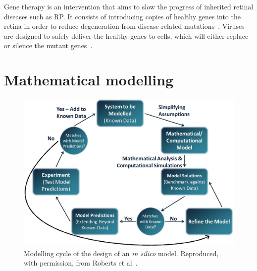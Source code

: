 \documentclass{article}
\begin{document}
Gene therapy is an intervention that aims to slow the progress of inherited retinal diseases such as RP.
It consists of introducing copies of healthy genes into the retina in order to reduce degeneration from disease-related mutations~\cite{Battu_2022}.
Viruses are designed to safely deliver the healthy genes to cells, which will either replace or silence the mutant genes~\cite{Battu_2022}.








\section{Mathematical modelling}\label{sec:MathematicalPrimer}


\begin{figure}[t!]
  \centering
  \includegraphics[width=1\linewidth]{ModellingCycle}
  \caption{Modelling cycle of the design of an \textit{in silico} model. Reproduced, with permission, from Roberts et al~\cite{Roberts_2016}.}
  \label{fig:ModellingCycle}
\end{figure}
\end{document}
